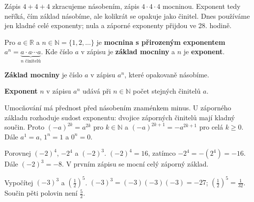 \documentclass[11pt,a4paper]{article}
\begin{document}

Zápis $4+4+4$ zkracujeme násobením, zápis $4\cdot4\cdot4$ mocninou. Exponent tedy neříká, čím základ násobíme, ale kolikrát se opakuje jako činitel. Dnes používáme jen kladné celé exponenty; nula a záporné exponenty přijdou ve 28. hodině.

\begin{definiceBox}[title={Definice},breakable=false]
Pro $a\in\mathbb R$ a $n\in\mathbb N=\{1,2,\ldots\}$ je \textbf{mocnina s přirozeným exponentem} $a^n=\underbrace{a\cdot a\cdots a}_{n\text{ činitelů}}$.
Kde číslo $a$ v zápisu je \textbf{základ mocniny} a $n$ je \textbf{exponent}.
\end{definiceBox}


\begin{definiceBox}[title={Definice},breakable=false]
\textbf{Základ mocniny} je číslo $a$ v zápisu $a^n$, které opakovaně násobíme.
\end{definiceBox}


\begin{definiceBox}[title={Definice},breakable=false]
\textbf{Exponent} $n$ v zápisu $a^n$ udává při $n\in\mathbb N$ počet stejných činitelů $a$.
\end{definiceBox}


Umocňování má přednost před násobením znaménkem minus. U záporného základu rozhoduje sudost exponentu: dvojice záporných činitelů mají kladný součin. Proto $(-a)^{2k}=a^{2k}$ pro $k\in\mathbb N$ a $(-a)^{2k+1}=-a^{2k+1}$ pro celá $k\ge0$. Dále $a^1=a$, $1^n=1$ a $0^n=0$.


\begin{prikladReseniBox}[title={Příklad 1},breakable=false]
Porovnej $(-2)^4$, $-2^4$ a $(-2)^3$.
\tcblower
$(-2)^4=16$, zatímco $-2^4=-(2^4)=-16$. Dále $(-2)^3=-8$. V prvním zápisu se mocní celý záporný základ.
\end{prikladReseniBox}


\begin{prikladReseniBox}[title={Příklad 2},breakable=false]
Vypočítej $(-3)^3$ a $\left(\frac12\right)^5$.
\tcblower
$(-3)^3=(-3)(-3)(-3)=-27$; $\left(\frac12\right)^5=\frac1{32}$. Součin pěti polovin není $\frac52$.
\end{prikladReseniBox}


\end{document}
